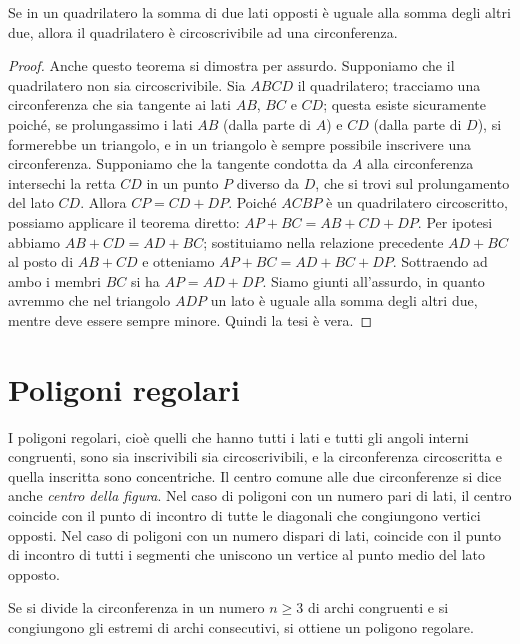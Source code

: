 \begin{teorema}[inverso]
Se in un quadrilatero la somma di due lati opposti è uguale alla somma degli altri due, allora il quadrilatero è circoscrivibile ad una circonferenza.
\end{teorema}

\begin{proof}
Anche questo teorema si dimostra per assurdo.
Supponiamo che il quadrilatero non sia circoscrivibile.
Sia $ABCD$ il quadrilatero; tracciamo una circonferenza che sia tangente ai lati $AB$, $BC$ e $CD$; questa esiste sicuramente poiché, se prolungassimo i lati $AB$ (dalla parte di $A$) e $CD$ (dalla parte di $D$), si formerebbe un triangolo, e in un triangolo è sempre possibile inscrivere una circonferenza. Supponiamo che la tangente condotta da $A$ alla circonferenza intersechi la retta $CD$ in un punto $P$ diverso da $D$, che si trovi sul prolungamento del lato $CD$. Allora $CP=CD+DP$. Poiché $ACBP$ è un quadrilatero circoscritto, possiamo applicare il teorema diretto: $AP+BC=AB+CD+DP$.
Per ipotesi abbiamo $AB+CD=AD+BC$; sostituiamo nella relazione precedente $AD+BC$ al posto di $AB+CD$ e otteniamo $AP+BC=AD+BC+DP$.
Sottraendo ad ambo i membri $BC$ si ha $AP=AD+DP$.
Siamo giunti all'assurdo, in quanto avremmo che nel triangolo $ADP$ un lato è uguale alla somma degli altri due, mentre deve essere sempre minore. Quindi la tesi è vera.
\end{proof}


\section{Poligoni regolari}

I poligoni regolari, cioè quelli che hanno tutti i lati e tutti gli angoli interni congruenti, sono sia inscrivibili sia circoscrivibili, e la circonferenza circoscritta e quella inscritta sono concentriche.
Il centro comune alle due circonferenze si dice anche \emph{centro della figura}.
Nel caso di poligoni con un numero pari di lati, il centro coincide con il punto di incontro di tutte le diagonali che congiungono vertici opposti. 
Nel caso di poligoni con un numero dispari di lati, coincide con il punto di incontro di tutti i segmenti che uniscono un vertice al punto medio del lato opposto.

\begin{teorema}
Se si divide la circonferenza in un numero $n\geq 3$ di archi congruenti e si congiungono gli estremi di archi consecutivi, si ottiene un poligono regolare.
\end{teorema}

